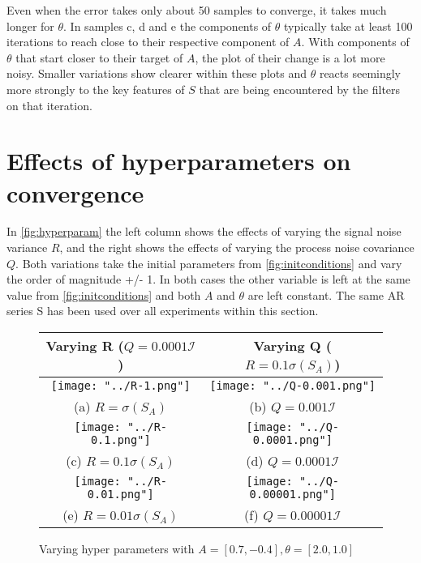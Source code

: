 \documentclass[sigconf]{acmart}
\begin{document}
Even when the error takes only about 50 samples to converge, it takes much longer for $\theta$. In samples c, d and e the components of $\theta$ typically take at least 100 iterations to reach close to their respective component of $A$.
With components of $\theta$ that start closer to their target of $A$, the plot of their change is a lot more noisy. Smaller variations show clearer within these plots and $\theta$ reacts seemingly more strongly to the key features of $S$ that are being encountered by the filters on that iteration. \\

\section{Effects of hyperparameters on convergence}
In \autoref{fig:hyperparam} the left column shows the effects of varying the signal noise variance $R$, and the right shows the effects of varying the process noise covariance $Q$. 
Both variations take the initial parameters from \autoref{fig:initconditions} and vary the order of magnitude +/- 1. In both cases the other variable is left at the same value from \autoref{fig:initconditions} and both $A$ and $\theta$ are left constant. The same AR series S has been used over all experiments within this section.
\begin{figure}[h]
  \centering
    \begin{tabular}{cc}
    \hline   
        Varying R ($Q = 0.0001\mathcal{I}$) & Varying Q ($R = 0.1\sigma(S_{A})$) \\
    \hline
      \texttt{[image: "../R-1.png"]} &   \texttt{[image: "../Q-0.001.png"]} \\
    (a) $R = \sigma(S_{A})$ & (b) $Q = 0.001\mathcal{I}$\\[6pt]
     \texttt{[image: "../R-0.1.png"]} &   \texttt{[image: "../Q-0.0001.png"]} \\
    (c) $R = 0.1\sigma(S_{A})$ & (d) $Q = 0.0001\mathcal{I}$\\[6pt]
    \texttt{[image: "../R-0.01.png"]} &   \texttt{[image: "../Q-0.00001.png"]} \\
    (e) $R = 0.01\sigma(S_{A})$ & (f) $Q = 0.00001\mathcal{I}$\\[6pt]
    \end{tabular}
    \caption{Varying hyper parameters with $A = [0.7, -0.4], \theta = [2.0, 1.0]$}
    \label{fig:hyperparam}
\end{figure}
\end{document}
